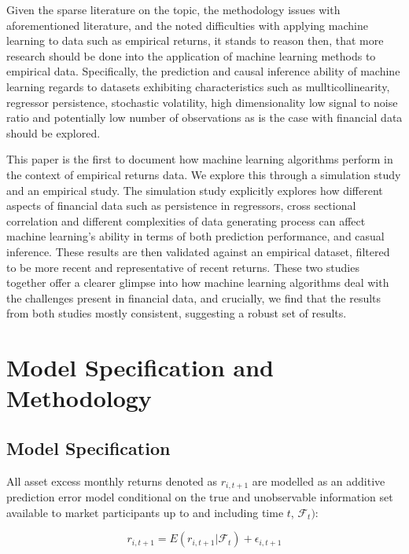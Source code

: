 \documentclass[11pt, a4paper, table]{article}
\begin{document}
Given the sparse literature on the topic, the methodology issues with aforementioned literature, and the noted difficulties with applying machine learning to data such as empirical returns, it stands to reason then, that more research should be done into the application of machine learning methods to empirical data. Specifically, the prediction and causal inference ability of machine learning regards to datasets exhibiting characteristics such as mullticollinearity, regressor persistence, stochastic volatility, high dimensionality low signal to noise ratio and potentially low number of observations as is the case with financial data should be explored.

This paper is the first to document how machine learning algorithms perform in the context of empirical returns data. We explore this through a simulation study and an empirical study. The simulation study explicitly explores how different aspects of financial data such as persistence in regressors, cross sectional correlation and different complexities of data generating process can affect machine learning's ability in terms of both prediction performance, and casual inference. These results are then validated against an empirical dataset, filtered to be more recent and representative of recent returns. These two studies together offer a clearer glimpse into how machine learning algorithms deal with the challenges present in financial data, and crucially, we find that the results from both studies mostly consistent, suggesting a robust set of  results.


\section{Model Specification and Methodology}

\subsection{Model Specification}

All asset excess monthly returns denoted as $r_{i, t+1}$ are modelled as an additive prediction error model conditional on the true and unobservable information set available to market participants up to and including time $t$, $\mathcal{F}_t)$:

\begin{equation}
	r_{i, t+1} = E(r_{i, t+1} | \mathcal{F}_t) + \epsilon_{i, t+1}
\end{equation}
\end{document}
